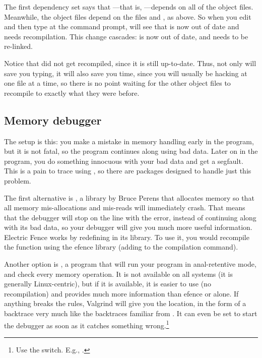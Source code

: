 The first dependency set says that ---that is, ---depends on all of the object files. Meanwhile, the object files
depend on the  files and , as above. So when
you edit  and then type  at the command prompt,
 will see that  is now out of date and needs
recompilation. This change cascades:  is now out of date,
and needs to be re-linked.

Notice that  did not get recompiled, since it is still
up-to-date. Thus, not only will  save you typing, it will also
save you time, since you will usually be hacking at one file at a time,
so there is no point waiting for the other object files to recompile
to exactly what they were before. 

\subsection{Memory debugger}  

The setup is this: you make a mistake in memory handling early in the
program, but it is not fatal, so the program continues along using bad
data. Later on in the program, you do something innocuous with your bad
data and get a segfault. This is a pain to trace using , so
there are packages designed to handle just this problem.

The first alternative is , a
library by Bruce Perens that allocates memory so that all memory
mis-allocations and mis-reads will immediately crash.  That means that
the debugger will stop on the line with the error, instead of continuing
along with its bad data, so your debugger will give you much more useful
information.  Electric Fence works by redefining  in 
its library. To use it, you would recompile the function
using the efence library (adding  to the compilation
command).


Another option is , a program that will
run your program in anal-retentive mode, and check every memory operation. 
It is not available on all systems (it is generally Linux-centric), but
if it is available, it is easier to use (no recompilation) and provides much more information than efence or
 alone. If anything breaks the rules, Valgrind will give you
the location, in the form of a backtrace very much like the backtraces
familiar from . It can even be set to start the debugger as soon
as it catches something wrong.\footnote{Use the  switch.
E.g., .}

